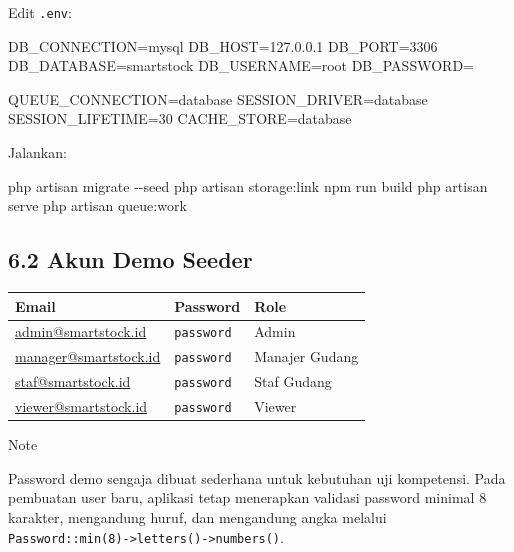 \documentclass[
]{article}
\newenvironment{Shaded}{}{}
\newcommand{\AttributeTok}[1]{\textcolor[rgb]{0.49,0.56,0.16}{#1}}
\newcommand{\ExtensionTok}[1]{#1}
\newcommand{\NormalTok}[1]{#1}
\begin{document}
Edit \texttt{.env}:

\begin{Shaded}
\begin{Highlighting}[]
\NormalTok{DB\_CONNECTION=mysql}
\NormalTok{DB\_HOST=127.0.0.1}
\NormalTok{DB\_PORT=3306}
\NormalTok{DB\_DATABASE=smartstock}
\NormalTok{DB\_USERNAME=root}
\NormalTok{DB\_PASSWORD=}

\NormalTok{QUEUE\_CONNECTION=database}
\NormalTok{SESSION\_DRIVER=database}
\NormalTok{SESSION\_LIFETIME=30}
\NormalTok{CACHE\_STORE=database}
\end{Highlighting}
\end{Shaded}

Jalankan:

\begin{Shaded}
\begin{Highlighting}[]
\ExtensionTok{php}\NormalTok{ artisan migrate }\AttributeTok{{-}{-}seed}
\ExtensionTok{php}\NormalTok{ artisan storage:link}
\ExtensionTok{npm}\NormalTok{ run build}
\ExtensionTok{php}\NormalTok{ artisan serve}
\ExtensionTok{php}\NormalTok{ artisan queue:work}
\end{Highlighting}
\end{Shaded}

\subsection{6.2 Akun Demo Seeder}\label{62-akun-demo-seeder}

\begin{longtable}[]{@{}P{0.20\textwidth}P{0.26\textwidth}P{0.50\textwidth}@{}}
\toprule\noalign{}
Email & Password & Role \\
\midrule\noalign{}
\endhead
\bottomrule\noalign{}
\endlastfoot
\url{admin@smartstock.id} & \texttt{password} & Admin \\
\url{manager@smartstock.id} & \texttt{password} & Manajer Gudang \\
\url{staf@smartstock.id} & \texttt{password} & Staf Gudang \\
\url{viewer@smartstock.id} & \texttt{password} & Viewer \\
\end{longtable}

Note

Password demo sengaja dibuat sederhana untuk kebutuhan uji kompetensi.
Pada pembuatan user baru, aplikasi tetap menerapkan validasi password
minimal 8 karakter, mengandung huruf, dan mengandung angka melalui
\texttt{Password::min(8)-\textgreater{}letters()-\textgreater{}numbers()}.
\end{document}
